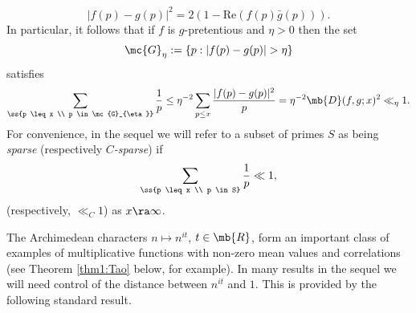 $$
|f(p)-g(p)|^2 = 2(1-\text{Re}(f(p)\bar{g}(p))).
$$
In particular, it follows that if $f$ is $g$-pretentious and $\eta > 0$ then the set 
$$
\mc{G}_{\eta} := \{p : |f(p)-g(p)| > \eta\}
$$
satisfies
$$
\sum_{\ss{p \leq x \\ p \in \mc{G}_{\eta}}} \frac{1}{p} \leq \eta^{-2} \sum_{p \leq x} \frac{|f(p)-g(p)|^2}{p} = \eta^{-2}\mb{D}(f,g;x)^2 \ll_{\eta} 1.
$$
%
%
For convenience, in the sequel we will refer to a subset of primes $S$ as being \emph{sparse} (respectively \emph{$C$-sparse}) if 
$$
\sum_{\ss{p \leq x \\ p \in S}} \frac{1}{p} \ll 1,
$$
(respectively, $\ll_C 1$) as $x \ra \infty$.

The Archimedean characters $n \mapsto n^{it}$, $t \in \mb{R}$, form an important class of examples of multiplicative functions with non-zero mean values and correlations (see Theorem \ref{thm1:Tao} below, for example). In many results in the sequel we will need control of the distance between $n^{it}$ and $1$. This is provided by the following standard result.
%

%
%
%
%
%
%
%
%
%
%

